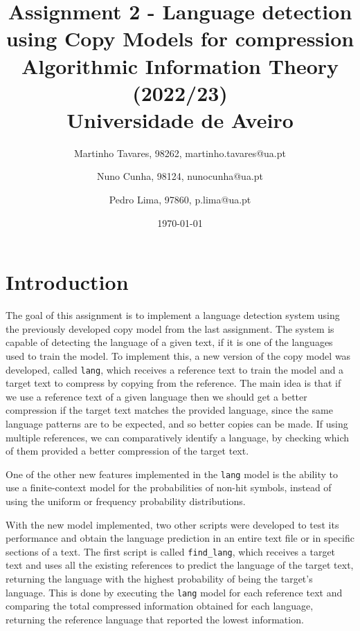 \documentclass{article}
\begin{document}
\title{
    Assignment 2 - Language detection using Copy Models for compression \\
    \large{Algorithmic Information Theory (2022/23) \\
    Universidade de Aveiro}
}

\author{
    Martinho Tavares, 98262, martinho.tavares@ua.pt \and
    Nuno Cunha, 98124, nunocunha@ua.pt \and
    Pedro Lima, 97860, p.lima@ua.pt
}

\date{\today}
\maketitle

\section{Introduction}
\label{sec:introduction}

The goal of this assignment is to implement a language detection system using the previously developed copy model from the last assignment.
The system is capable of detecting the language of a given text, if it is one of the languages used to train the model.
To implement this, a new version of the copy model was developed, called \texttt{lang}, which receives a reference text to train the model and a target text to compress by copying from the reference.
The main idea is that if we use a reference text of a given language then we should get a better compression if the target text matches the provided language, since the same language patterns are to be expected, and so better copies can be made.
If using multiple references, we can comparatively identify a language, by checking which of them provided a better compression of the target text.

One of the other new features implemented in the \texttt{lang} model is the ability to use a finite-context model for the probabilities of non-hit symbols, instead of using the uniform or frequency probability distributions.

With the new model implemented, two other scripts were developed to test its performance and obtain the language prediction in an entire text file or in specific sections of a text.
The first script is called \texttt{find_lang}, which receives a target text and uses all the existing references to predict the language of the target text, returning the language with the highest probability of being the target's language.
This is done by executing the \texttt{lang} model for each reference text and comparing the total compressed information obtained for each language, returning the reference language that reported the lowest information.
\end{document}

